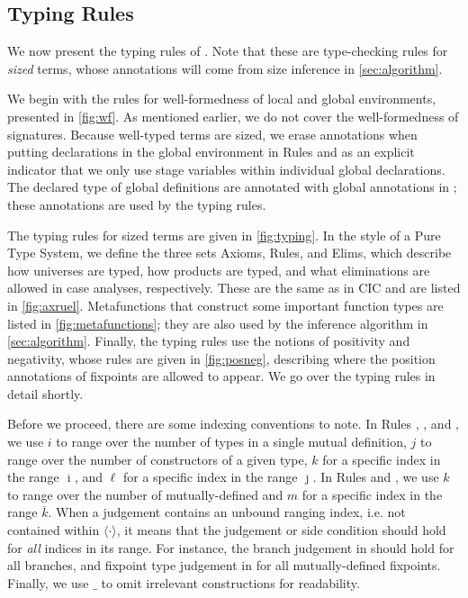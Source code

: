 \documentclass[nonacm,screen,10pt]{acmart}
\begin{document}
\subsection{Typing Rules}









We now present the typing rules of \lang. Note that these are type-checking rules for \textit{sized} terms, whose annotations will come from size inference in \autoref{sec:algorithm}.

We begin with the rules for well-formedness of local and global environments, presented in \autoref{fig:wf}. As mentioned earlier, we do not cover the well-formedness of signatures. Because well-typed terms are sized, we erase annotations when putting declarations in the global environment in Rules  and  as an explicit indicator that we only use stage variables within individual global declarations. The declared type of global definitions are annotated with global annotations in ; these annotations are used by the typing rules.

The typing rules for sized terms are given in \autoref{fig:typing}. In the style of a Pure Type System, we define the three sets Axioms, Rules, and Elims, which describe how universes are typed, how products are typed, and what eliminations are allowed in case analyses, respectively. These are the same as in CIC and are listed in \autoref{fig:axruel}. Metafunctions that construct some important function types are listed in \autoref{fig:metafunctions}; they are also used by the inference algorithm in \autoref{sec:algorithm}. Finally, the typing rules use the notions of positivity and negativity, whose rules are given in \autoref{fig:posneg}, describing where the position annotations of fixpoints are allowed to appear. We go over the typing rules in detail shortly.

Before we proceed, there are some indexing conventions to note. In Rules , , and , we use $i$ to range over the number of \coinductive types in a single mutual \coinductive definition, $j$ to range over the number of constructors of a given \coinductive type, $k$ for a specific index in the range $\overline{\imath}$, and $\ell$ for a specific index in the range $\overline{\jmath}$. In Rules  and , we use $k$ to range over the number of mutually-defined \cofixpoints and $m$ for a specific index in the range $\overline{k}$. When a judgement contains an unbound ranging index, i.e. not contained within $\langle \cdot \rangle$, it means that the judgement or side condition should hold for \textit{all} indices in its range. For instance, the branch judgement in  should hold for all branches, and fixpoint type judgement in  for all mutually-defined fixpoints. Finally, we use $\_$ to omit irrelevant constructions for readability.
\end{document}
